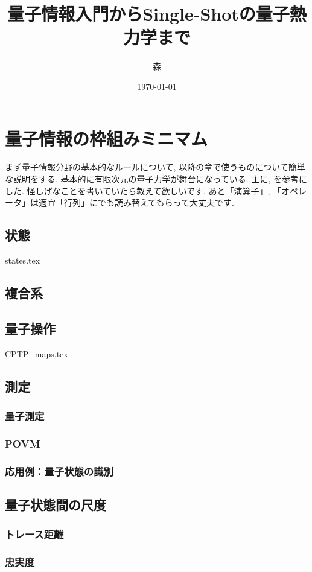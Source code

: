 \documentclass[report]{jlreq}
\title{量子情報入門からSingle-Shotの量子熱力学まで}
\author{森}
\date{\today}
\begin{document}
\maketitle

\setcounter{tocdepth}{1}
\thispagestyle{TOC}
\tableofcontents


\pagestyle{mystyle}
\chapter{量子情報の枠組みミニマム}
まず量子情報分野の基本的なルールについて, 以降の章で使うものについて簡単な説明をする. 
基本的に有限次元の量子力学が舞台になっている. 
主に\cite{nielsen2010quantum}, \cite{SagawaEntropy}を参考にした. 
怪しげなことを書いていたら教えて欲しいです. 
あと「演算子」, 「オペレータ」は適宜「行列」にでも読み替えてもらって大丈夫です. 
\section{状態}
{states.tex}
\section{複合系}
\section{量子操作}
{CPTP_maps.tex}
\section{測定}
\subsection{量子測定}
\subsection{POVM}
\subsection{応用例：量子状態の識別}
\section{量子状態間の尺度}
\subsection{トレース距離}
\subsection{忠実度}
\end{document}
